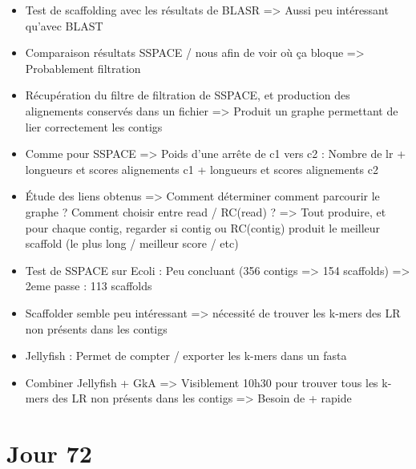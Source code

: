\documentclass[12pt]{report}
\begin{document}
\begin{itemize}
	\item Test de scaffolding avec les résultats de BLASR => Aussi peu intéressant qu'avec BLAST
	
	\item Comparaison résultats SSPACE / nous afin de voir où ça bloque => Probablement filtration
	
	\item Récupération du filtre de filtration de SSPACE, et production des alignements conservés dans un fichier => Produit un graphe
		  permettant de lier correctement les contigs
		  
	\item Comme pour SSPACE => Poids d'une arrête de c1 vers c2 : Nombre de lr + longueurs et scores alignements c1 + longueurs et scores alignements c2
		  
	\item Étude des liens obtenus => Comment déterminer comment parcourir le graphe ? Comment choisir entre read / RC(read) ?
		  => Tout produire, et pour chaque contig, regarder si contig ou RC(contig) produit le meilleur scaffold (le plus long / meilleur score / etc)
	
	\item Test de SSPACE sur Ecoli : Peu concluant (356 contigs => 154 scaffolds) => 2eme passe : 113 scaffolds
	
	\item Scaffolder semble peu intéressant => nécessité de trouver les k-mers des LR non présents dans les contigs
	
	\item Jellyfish : Permet de compter / exporter les k-mers dans un fasta
	
	\item Combiner Jellyfish + GkA => Visiblement 10h30 pour trouver tous les k-mers des LR non présents dans les contigs => Besoin de + rapide
\end{itemize}

\section{Jour 72}
\end{document}
